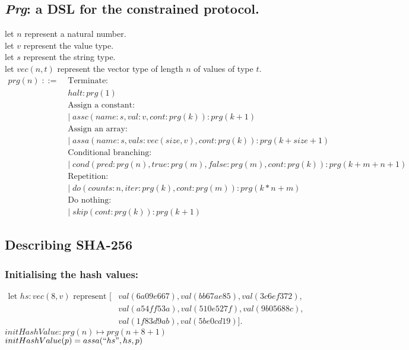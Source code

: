 \documentclass[11pt]{article}
\begin{document}
  \subsection{\textit{Prg}: a DSL for the constrained protocol.}
  let $n$ represent a natural number. \\
  let $v$ represent the value type. \\
  let $s$ represent the string type. \\
  let $vec(n, t)$ represent the vector type of length $n$ of 
    values of type $t$.
  \begin{align*}
  prg(n)\; ::=\; &\text{Terminate: } \\
                 &halt : prg(1) \\
                 &\text{Assign a constant: } \\
                 &|\; assc(name:s,val:v,cont:prg(k)) 
                        : prg (k + 1) \\
                 &\text{Assign an array: } \\
                 &|\; assa(name:s,vals : vec(size, v), cont:prg(k))
                        : prg (k + size + 1) \\
                 &\text{Conditional branching: } \\
                 &|\; cond(pred : prg(n), true : prg(m),
                        false : prg(m), cont: prg(k)) 
                        : prg(k + m + n + 1) \\
                 &\text{Repetition: } \\
                 &|\; do(counts : n, iter : prg(k), cont : prg(m))
                        : prg(k * n + m) \\
                 &\text{Do nothing: } \\
                 &|\; skip(cont : prg(k)) : prg(k + 1)
  \end{align*}

  \subsection{Describing SHA-256}
  \subsubsection{Initialising the hash values:}
  \begin{align*}
  \text{let $hs : vec(8, v)$ represent } 
          [&val(6a09e667),val(bb67ae85), val(3c6ef372), \\
           &val(a54ff53a),val(510e527f), val(9b05688c), \\
           &val(1f83d9ab),val(5be0cd19)].
  \end{align*}
  $initHashValue : prg(n) \mapsto prg(n + 8 + 1)$ \\
  $initHashValue(p) = assa(``hs",hs,p)$
\end{document}
